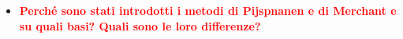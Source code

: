 \documentclass[a4paper, 15pt]{article}
\begin{document}
\begin{itemize}
\item
\textcolor{red}{\textbf{Perché sono stati introdotti i metodi di Pijspnanen e di Merchant e su quali basi? Quali sono le loro differenze?}}\\
%


\end{itemize}
\end{document}
